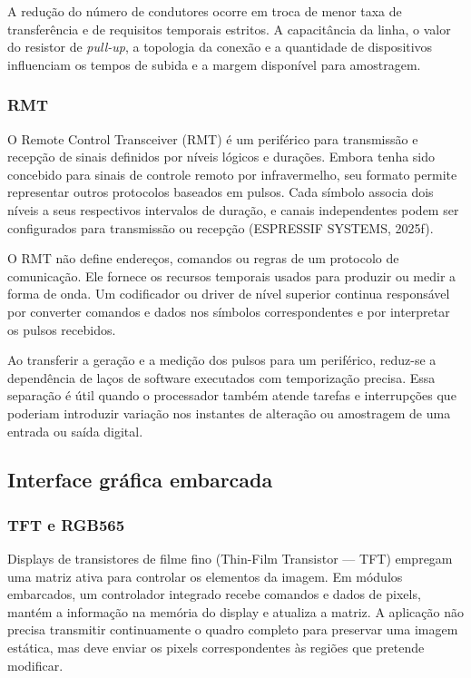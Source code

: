 \documentclass[a4paper,12pt]{article}
\begin{document}
A redu\c{c}\~ao do n\'umero de condutores ocorre em troca de menor taxa de transfer\^encia e de requisitos temporais estritos. A capacit\^ancia da linha, o valor do resistor de \emph{pull-up}, a topologia da conex\~ao e a quantidade de dispositivos influenciam os tempos de subida e a margem dispon\'ivel para amostragem.


\subsubsection{RMT}


O Remote Control Transceiver (RMT) \'e um perif\'erico para transmiss\~ao e recep\c{c}\~ao de sinais definidos por n\'iveis l\'ogicos e dura\c{c}\~oes. Embora tenha sido concebido para sinais de controle remoto por infravermelho, seu formato permite representar outros protocolos baseados em pulsos. Cada s\'imbolo associa dois n\'iveis a seus respectivos intervalos de dura\c{c}\~ao, e canais independentes podem ser configurados para transmiss\~ao ou recep\c{c}\~ao (ESPRESSIF SYSTEMS, 2025f).


O RMT n\~ao define endere\c{c}os, comandos ou regras de um protocolo de comunica\c{c}\~ao. Ele fornece os recursos temporais usados para produzir ou medir a forma de onda. Um codificador ou driver de n\'ivel superior continua respons\'avel por converter comandos e dados nos s\'imbolos correspondentes e por interpretar os pulsos recebidos.


Ao transferir a gera\c{c}\~ao e a medi\c{c}\~ao dos pulsos para um perif\'erico, reduz-se a depend\^encia de la\c{c}os de software executados com temporiza\c{c}\~ao precisa. Essa separa\c{c}\~ao \'e \'util quando o processador tamb\'em atende tarefas e interrup\c{c}\~oes que poderiam introduzir varia\c{c}\~ao nos instantes de altera\c{c}\~ao ou amostragem de uma entrada ou sa\'ida digital.


\subsection{Interface gr\'afica embarcada}


\subsubsection{TFT e RGB565}


Displays de transistores de filme fino (Thin-Film Transistor --- TFT) empregam uma matriz ativa para controlar os elementos da imagem. Em m\'odulos embarcados, um controlador integrado recebe comandos e dados de pixels, mant\'em a informa\c{c}\~ao na mem\'oria do display e atualiza a matriz. A aplica\c{c}\~ao n\~ao precisa transmitir continuamente o quadro completo para preservar uma imagem est\'atica, mas deve enviar os pixels correspondentes \`as regi\~oes que pretende modificar.
\end{document}
